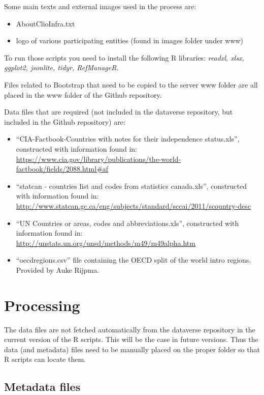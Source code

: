 \documentclass[a4paper]{article}
\begin{document}
Some main texts and external images used in the process are:
\begin{itemize}
 \item AboutClioInfra.txt
 \item logo of various participating entities (found in images folder under www)
\end{itemize}

To run those scripts you need to install the following R libraries: 
\textit{readxl, xlsx, ggplot2, jsonlite, tidyr, RefManageR.}

Files related to Bootstrap that need to be copied to the server www folder are 
all placed in the www folder of the Github repository.

Data files that are required (not included in the dataverse repository, but 
included in the Github repository) are:
\begin{itemize}
 \item ``CIA-Factbook-Countries with notes for their independence status.xls'', 
constructed with information found in: 
\url{
https://www.cia.gov/library/publications/the-world-factbook/fields/2088.html#af}
 \item ``statcan - countries list and codes from statistics canada.xls'', 
constructed with information found in: 
\url{http://www.statcan.gc.ca/eng/subjects/standard/sccai/2011/scountry-desc}
 \item ``UN Countries or areas, codes and abbreviations.xls'', constructed with 
information found in:
\url{http://unstats.un.org/unsd/methods/m49/m49alpha.htm}
\item ``oecdregions.csv'' file containing the OECD split of the world intro 
regions. Provided by Auke Rijpma.
\end{itemize}

\section{Processing}

The data files are not fetched automatically from the dataverse repository in 
the current version of the R scripts. This will be the case in future versions.
Thus the data (and metadata) files need to be manually placed on the proper 
folder so that R scripts can locate them. 

\subsection{Metadata files}
\end{document}
